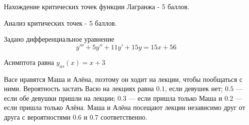 \documentclass[addpoints, answers]{exam} %
\begin{document}
\begin{questions}
\begin{solution}
Нахождение критических точек функции Лагранжа - 5 баллов.

Анализ критических точек - 5 баллов.
\end{solution}

\question Задано дифференциальное уравнение
 \[
 y'''+5y''+11y'+15y=15x+56
 \]

\begin{solution}
Асимптота равна $y_{as}(x)=x+3$

\end{solution}




\question Васе нравятся Маша и Алёна, поэтому он ходит на лекции, чтобы пообщаться с ними. Вероятность застать Васю на лекциях равна $0.1$, если девушек нет; $0.5$ --- если обе девушки пришли на лекции; $0.3$ --- если пришла только Маша и $0.2$ --- если пришла только Алёна. Маша и Алёна посещают лекции независимо друг от друга с вероятностями $0.6$ и $0.7$ соответственно.



\end{questions}
\end{document}
